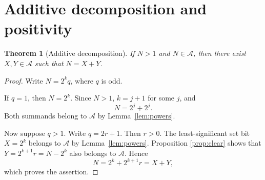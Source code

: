 \documentclass[11pt]{article}
\newtheorem{theorem}{Theorem}[section]
\theoremstyle{definition}
\theoremstyle{remark}
\newcommand{\SeqA}{\mathcal{A}}
\begin{document}
\section{Additive decomposition and positivity}

\begin{theorem}[Additive decomposition]\label{thm:additive}
If $N>1$ and $N\in\SeqA$, then there exist $X,Y\in\SeqA$ such that
$N=X+Y$.
\end{theorem}
\begin{proof}
Write $N=2^kq$, where $q$ is odd.

If $q=1$, then $N=2^k$.  Since $N>1$, $k=j+1$ for some $j$, and
\[
                 N=2^j+2^j.
\]
Both summands belong to $\SeqA$ by Lemma~\ref{lem:powers}.

Now suppose $q>1$.  Write $q=2r+1$.  Then $r>0$.  The least-significant set
bit $X=2^k$ belongs to $\SeqA$ by Lemma~\ref{lem:powers}.  Proposition
\ref{prop:clear} shows that
$Y=2^{k+1}r=N-2^k$ also belongs to $\SeqA$.  Hence
\[
                 N=2^k+2^{k+1}r=X+Y,
\]
which proves the assertion.
\end{proof}
\end{document}
